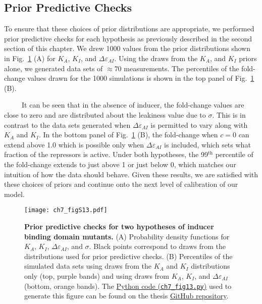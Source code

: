 \documentclass[12pt]{caltech_thesis}
\begin{document}
\hypertarget{prior-predictive-checks-2}{%
\subsection{Prior Predictive Checks}\label{prior-predictive-checks-2}}

To ensure that these choices of prior distributions are appropriate, we
performed prior predictive checks for each hypothesis as previously
described in the second section of this chapter. We drew 1000 values
from the prior distributions shown in
Fig.~\ref{fig:ind_prior_predictive} (A) for \(K_A\), \(K_I\), and
\(\Delta\varepsilon_{AI}\). Using the draws from the \(K_A\), and
\(K_I\) priors alone, we generated data sets of \(\approx 70\)
measurements. The percentiles of the fold-change values drawn for the
1000 simulations is shown in the top panel of
Fig.~\ref{fig:ind_prior_predictive} (B).

~~~~~It can be seen that in the absence of inducer, the fold-change
values are close to zero and are distributed about the leakiness value
due to \(\sigma\). This is in contrast to the data sets generated when
\(\Delta\varepsilon_{AI}\) is permitted to vary along with \(K_A\) and
\(K_I\). In the bottom panel of Fig.~\ref{fig:ind_prior_predictive} (B),
the fold-change when \(c = 0\) can extend above 1.0 which is possible
only when \(\Delta\varepsilon_{AI}\) is included, which sets what
fraction of the repressors is active. Under both hypotheses, the
99\(^\text{th}\) percentile of the fold-change extends to just above 1
or just below 0, which matches our intuition of how the data should
behave. Given these results, we are satisfied with these choices of
priors and continue onto the next level of calibration of our model.

\hypertarget{fig:ind_prior_predictive}{%
\begin{figure}
\centering
\texttt{[image: ch7\_figS13.pdf]}
\caption[{Prior predictive checks for two hypotheses of inducer binding
domain mutants.}]{\textbf{Prior predictive checks for two hypotheses of
inducer binding domain mutants.} (A) Probability density functions for
\(K_A\), \(K_I\), \(\Delta\varepsilon_{AI}\), and \(\sigma\). Black
points correspond to draws from the distributions used for prior
predictive checks. (B) Percentiles of the simulated data sets using
draws from the \(K_A\) and \(K_I\) distributions only (top, purple
bands) and using draws from \(K_A\), \(K_I\), and
\(\Delta\varepsilon_{AI}\) (bottom, orange bands). The
\href{https://github.com/gchure/phd/blob/master/src/chapter_07/code/ch7_figS13.py}{Python
code (\texttt{ch7\_fig13.py})} used to generate this figure can be found
on the thesis \href{https://github.com/gchure/phd}{GitHub repository}.}
\label{fig:ind_prior_predictive}
\end{figure}
}
\end{document}
